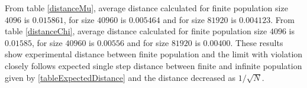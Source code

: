 \newpage

From table \ref{distanceMu}, average distance calculated for finite population size $4096$ is $0.015861$, 
for size $40960$ is $0.005464$ and for size $81920$ is $0.004123$. From table \ref{distanceChi}, 
average distance calculated for finite population size $4096$ is $0.01585$, 
for size $40960$ is $0.00556$ and for size $81920$ is $0.00400$.
These results show experimental distance between finite population and the limit with violation closely follows expected single step distance 
between finite and infinite population given by \ref{tableExpectedDistance} and the distance decreased as $1/\sqrt{N}$.








 
